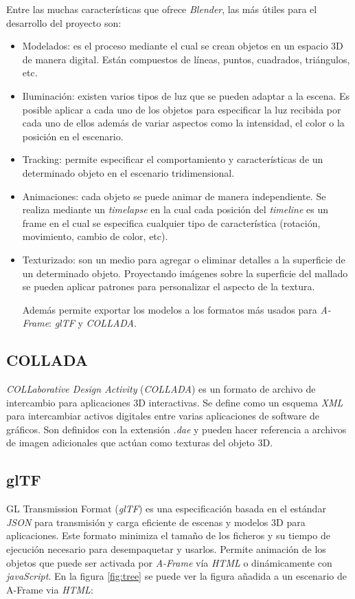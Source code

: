 Entre las muchas características que ofrece \textit{Blender}, las más útiles para el desarrollo del proyecto son:
\begin{itemize}
    \item Modelados: es el proceso mediante el cual se crean objetos en un espacio 3D de manera digital. Están compuestos de líneas, puntos, cuadrados, triángulos, etc. 
    
    \item Iluminación: existen varios tipos de luz que se pueden adaptar a la escena. Es posible aplicar a cada uno de los objetos para especificar la luz recibida por cada uno de ellos además de variar aspectos como la intensidad, el color o la posición en el escenario.
    
    \item Tracking: permite especificar el comportamiento y características de un determinado objeto en el escenario tridimensional. 
    \item Animaciones: cada objeto se puede animar de manera independiente. Se realiza mediante un \textit{timelapse} en la cual cada posición del \textit{timeline} es un frame en el cual se especifica cualquier tipo de característica (rotación, movimiento, cambio de color, etc).  
    
    \item Texturizado: son un medio para agregar o eliminar detalles a la superficie de un determinado objeto. Proyectando imágenes sobre la superficie del mallado se pueden aplicar patrones para personalizar el aspecto de la textura. 

    Además permite exportar los modelos a los formatos más usados para \textit{A-Frame}: \textit{glTF} y \textit{COLLADA}. 
\end{itemize}
\subsection{COLLADA}
\textit{COLLaborative Design Activity} (\textit{COLLADA}) es un  formato de archivo de intercambio para aplicaciones 3D interactivas. Se define como un esquema \textit{XML} para intercambiar activos digitales entre varias aplicaciones de software de gráficos. Son definidos con la extensión \textit{.dae} y pueden hacer referencia a archivos de imagen adicionales que actúan como texturas del objeto 3D. 

\subsection{glTF}
GL Transmission Format (\textit{glTF}) es una especificación basada en el estándar \textit{JSON} para transmisión y carga eficiente de escenas y modelos 3D para aplicaciones. Este formato minimiza el tamaño de los ficheros y su tiempo de ejecución necesario para desempaquetar y usarlos. Permite animación de los objetos que puede ser activada por \textit{A-Frame} vía \textit{HTML} o dinámicamente con \textit{javaScript}. 
En la figura \ref{fig:tree} se puede ver la figura añadida a un escenario de A-Frame via \textit{HTML}:


